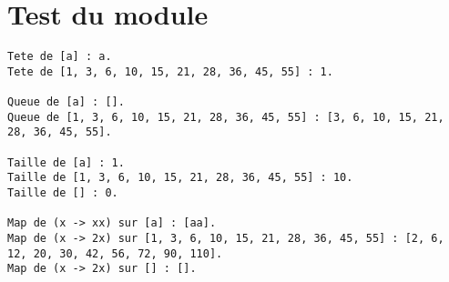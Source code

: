 \documentclass{report}
\begin{document}
\section{Test du module}
\begin{lstlisting}[style=xslt]
Tete de [a] : a.
Tete de [1, 3, 6, 10, 15, 21, 28, 36, 45, 55] : 1.

Queue de [a] : [].
Queue de [1, 3, 6, 10, 15, 21, 28, 36, 45, 55] : [3, 6, 10, 15, 21, 28, 36, 45, 55].

Taille de [a] : 1.
Taille de [1, 3, 6, 10, 15, 21, 28, 36, 45, 55] : 10.
Taille de [] : 0.

Map de (x -> xx) sur [a] : [aa].
Map de (x -> 2x) sur [1, 3, 6, 10, 15, 21, 28, 36, 45, 55] : [2, 6, 12, 20, 30, 42, 56, 72, 90, 110].
Map de (x -> 2x) sur [] : [].
\end{lstlisting}
\end{document}
